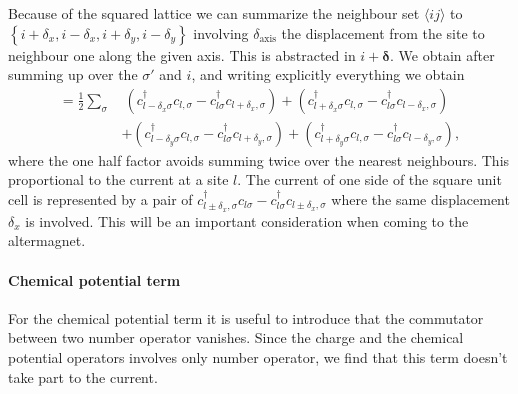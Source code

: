 \documentclass[../main.tex]{subfile}
\begin{document}
Because of the squared lattice we can summarize the neighbour set $\langle ij\rangle$ to $\left\{ i + \delta_x , i - \delta_x, i + \delta_y, i - \delta_y   \right\}$ involving
$\delta_{\text{axis}}$ the displacement from the site to neighbour one along the given axis. This is abstracted in $i+ \bm{\delta}$.
We obtain after summing up over the $\sigma'$ and $i$, and writing explicitly everything we obtain 
\begin{equation}\label{Eq:CurrentHoppingCommu}
    \begin{aligned}
        =\frac{1}{2} \sum_{\sigma} 
       &~(c_{l-\delta_x\sigma}^{\dagger}c_{l,\sigma} -c_{l\sigma}^{\dagger}c_{l+\delta_x,\sigma})  
       +(c_{l+\delta_x\sigma}^{\dagger}c_{l,\sigma} -c_{l\sigma}^{\dagger}c_{l-\delta_x,\sigma})\\
       &+(c_{l-\delta_y\sigma}^{\dagger}c_{l,\sigma} -c_{l\sigma}^{\dagger}c_{l+\delta_y,\sigma})
       +(c_{l+\delta_y\sigma}^{\dagger}c_{l,\sigma} -c_{l\sigma}^{\dagger}c_{l-\delta_y,\sigma}),
\end{aligned}
\end{equation}
where the one half factor avoids summing twice over the nearest neighbours. This proportional to the current at a site $l$.
The current of one side of the square unit cell is represented by a pair of $c_{l\pm\delta_x,\sigma}^{\dagger}c_{l\sigma} -c_{l\sigma}^{\dagger}c_{l\pm\delta_x,\sigma}$
where the same displacement $\delta_x$ is involved. This will be an important consideration when coming to the altermagnet.\\

\paragraph{Chemical potential term} For the chemical potential term it is useful to introduce that the commutator between two number operator vanishes. 
Since the charge and the chemical potential operators involves only number operator, we find that this term doesn't take part
to the current.
\end{document}
